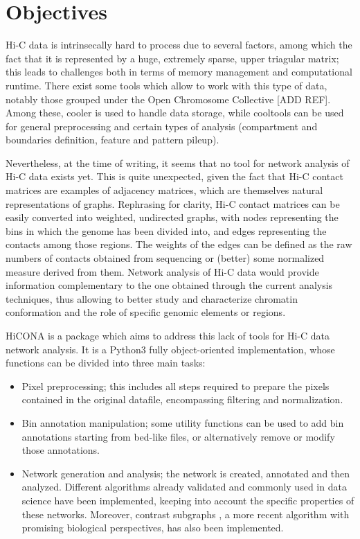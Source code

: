 \graphicspath{{chapters/03_objectives/}}
\chapter{Objectives}


Hi-C data is intrinsecally hard to process due to several factors, among which the fact that it is represented by a huge, extremely sparse, upper triagular matrix; this leads to challenges both in terms of memory management and computational runtime. There exist some tools which allow to work with this type of data, notably those grouped under the Open Chromosome Collective [ADD REF]. Among these, cooler \cite{cooler2020} is used to handle data storage, while cooltools \cite{cooltools2022} can be used for general preprocessing and certain types of analysis (compartment and boundaries definition, feature and pattern pileup). 

Nevertheless, at the time of writing, it seems that no tool for network analysis of Hi-C data exists yet. This is quite unexpected, given the fact that Hi-C contact matrices are examples of adjacency matrices, which are themselves natural representations of graphs. Rephrasing for clarity, Hi-C contact matrices can be easily converted into weighted, undirected graphs, with nodes representing the bins in which the genome has been divided into, and edges representing the contacts among those regions. The weights of the edges can be defined as the raw numbers of contacts obtained from sequencing or (better) some normalized measure derived from them. Network analysis of Hi-C data would provide information complementary to the one obtained through the current analysis techniques, thus allowing to better study and characterize chromatin conformation and the role of specific genomic elements or regions. 

HiCONA is a package which aims to address this lack of tools for Hi-C data network analysis. It is a Python3 fully object-oriented implementation, whose functions can be divided into three main tasks:
\begin{itemize}\tightlist
  \item Pixel preprocessing; this includes all steps required to prepare the pixels contained in the original datafile, encompassing filtering and normalization.
  \item Bin annotation manipulation; some utility functions can be used to add bin annotations starting from bed-like files, or alternatively remove or modify those annotations.
  \item Network generation and analysis; the network is created, annotated and then analyzed. Different algorithms already validated and commonly used in data science have been implemented, keeping into account the specific properties of these networks. Moreover, contrast subgraphs \cite{contrast2020, contrast2023}, a more recent algorithm with promising biological perspectives, has also been implemented.
\end{itemize}

